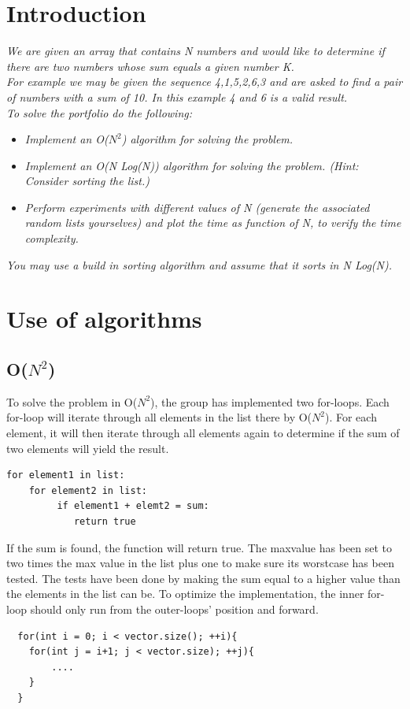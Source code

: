 \section{Introduction}
\emph{We are given an array that contains N numbers and would like to determine if there are two numbers whose sum equals a given number K.\\
For example we may be given the sequence 4,1,5,2,6,3 and are asked to find a pair of numbers with a sum of 10. In this example 4 and 6 is a valid result.\\
To solve the portfolio do the following:}
\begin{itemize}

\item \emph{Implement an O(\(N^{2}\)) algorithm for solving the problem.}
\item \emph{Implement an O(N Log(N)) algorithm for solving the problem. (Hint: Consider sorting the list.)}
\item \emph{Perform experiments with different values of N (generate the associated random lists yourselves)
and plot the time as function of N, to verify the time complexity.}
\end{itemize}
\emph{You may use a build in sorting algorithm and assume that it sorts in N Log(N).}

\section{Use of algorithms}
\subsection{O(\(N^{2}\))}
To solve the problem in O(\(N^{2}\)), the group has implemented two for-loops. Each for-loop will iterate through all elements in the list there by O(\(N^{2}\)). For each element, it will then iterate through all elements again to determine if the sum of two elements will yield the result.
\begin{lstlisting}
for element1 in list:
    for element2 in list:
         if element1 + elemt2 = sum:
            return true
\end{lstlisting}
If the sum is found, the function will return true.
The maxvalue has been set to two times the max value in the list plus one to make sure its worstcase has been tested.
The tests have been done by making the sum equal to a higher value than the elements in the list can be.
To optimize the implementation, the inner for-loop should only run from the outer-loops' position and forward.
\begin{lstlisting}
  for(int i = 0; i < vector.size(); ++i){
  	for(int j = i+1; j < vector.size); ++j){
  		....
  	}
  }
\end{lstlisting}

